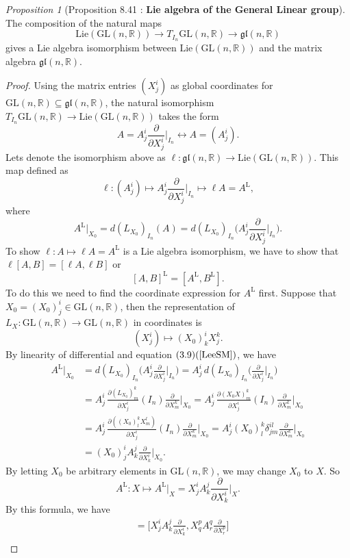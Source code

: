 \documentclass[a4paper]{article}
\theoremstyle{remark}
\newtheorem{prop}{Proposition}
\newcommand{\er}{\mathbb{R}} %
\newcommand{\doo}{\partial}    %
\newcommand{\subhim}{\subseteq} %
\newcommand{\GL}{\text{GL}(n,\er)} %
\newcommand{\LieGL}{\text{Lie}(\text{GL}(n,\er))} %
\newcommand{\TInGL}{T_{I_n}\text{GL}(n,\er)} %
\newcommand{\lieMatrix}{\mathfrak{gl}(n,\er)} %
\newcommand{\Ltegak}{\text{L}} %
\begin{document}
\begin{prop}[Proposition 8.41 \cite{LeeSM} : \textbf{Lie algebra of the General Linear group}]
The composition of the natural maps
$$
\LieGL \to \TInGL \to \lieMatrix
$$
gives a Lie algebra isomorphism between $\LieGL$ and the matrix algebra $\lieMatrix$.
\end{prop}
\begin{proof}
Using the matrix entries $(X^i_j)$ as global coordinates for $\GL \subhim \lieMatrix$, the natural isomorphism $\TInGL \to \LieGL$ takes the form
$$
A=A^i_j \frac{\doo}{\doo X^i_j}\bigg|_{I_n} \longleftrightarrow A = (A^i_j).
$$
Lets denote the isomorphism above as $ \ell : \lieMatrix \to \LieGL$. This map defined as 
$$
\ell : (A^i_j) \longmapsto A^i_j \frac{\doo}{\doo X^i_j}\bigg|_{I_n} \longmapsto \ell A = A^{\Ltegak}, 
$$
where 
$$
A^{\Ltegak}|_{X_0} = d(L_{X_0})_{I_n}(A) = d(L_{X_0})_{I_n}\bigg( A^i_j \frac{\doo}{\doo X^i_j}\bigg|_{I_n} \bigg).
$$
To show $\ell : A \mapsto \ell A = A^{\Ltegak}$ is a Lie algebra isomorphism, we have to show that $\ell[A,B]= [\ell A,\ell B]$ or
$$
 [A,B]^{\Ltegak} = [A^{\Ltegak}, B^{\Ltegak}] .
$$
To do this we need to find the coordinate expression for $A^{\Ltegak}$ first. Suppose that $X_0=(X_0)^i_j \in \GL$, then the representation of $L_X : \GL \to \GL$ in coordinates is
$$
(X^i_j) \mapsto (X_0)^i_k X^k_j.
$$
By linearity of differential and equation $(3.9) (\cite{LeeSM})$, we have
\begin{align*}
A^{\Ltegak}|_{X_0} &= d(L_{X_0})_{I_n}\bigg( A^i_j \frac{\doo}{\doo X^i_j}\bigg|_{I_n} \bigg) = A^i_j\,   d(L_{X_0})_{I_n}\bigg( \frac{\doo}{\doo X^i_j}\bigg|_{I_n} \bigg) \\
&= A^i_j \, \frac{\doo (L_{X_0})^k_m}{\doo X^i_j}(I_n) \frac{\doo}{\doo X^k_m}\bigg|_{X_0} = A^i_j \, \frac{\doo (X_0X)^k_m}{\doo X^i_j}(I_n) \frac{\doo}{\doo X^k_m}\bigg|_{X_0} \\
&= A^i_j \, \frac{\doo ((X_0)^k_l X^l_m)}{\doo X^i_j}(I_n) \frac{\doo}{\doo X^k_m}\bigg|_{X_0}  = A^i_j (X_0)^k_l \delta^{il}_{jm} \frac{\doo}{\doo X^k_m}\bigg|_{X_0}\\
&=   (X_0)^i_j  A^j_k \frac{\doo}{\doo X^i_k}\bigg|_{X_0}.
\end{align*}
By letting $X_0$ be arbitrary elements in $\GL$, we may change $X_0$ to $X$. So
$$
A^{\Ltegak}: X \longmapsto A^{\Ltegak}|_X = X^i_j A^j_k  \frac{\doo}{\doo X^i_k}\bigg|_{X}.
$$
By this formula, we have
\begin{align*}
[A^{\Ltegak},B^{\Ltegak}] &= \bigg[ X^i_j A^j_k  \frac{\doo}{\doo X^i_k} , X^p_q A^q_r  \frac{\doo}{\doo X^p_r}\bigg] \\

\end{align*}
\end{proof}
\end{document}
